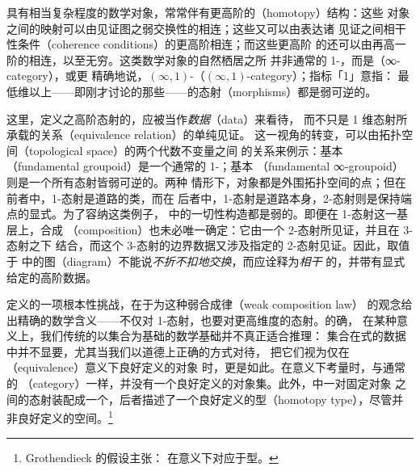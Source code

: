 具有相当复杂程度的数学对象，常常伴有更高阶的\trHomotopy{}（homotopy）结构：这些
对象之间的映射可以由见证图之弱交换性的\trHomotopy{}相连；这些\trHomotopy{}又可以由表达诸
见证之间相干性条件（coherence conditions）的更高阶\trHomotopy{}相连；而这些更高阶
的\trHomotopy{}还可以由再高一阶的\trHomotopy{}相连，以至无穷。这类数学对象的自然栖居之所
并非通常的 1-\trCategory{}，而是\textbf{\trInfinityCategory}（∞-category），或更
精确地说，$(\infty,1)$-\trCategory{}（$(\infty,1)$-category）；指标「1」意指：
最低维以上——即刚才讨论的那些\trHomotopy——的态射（morphisms）都是弱可逆的。

这里，定义\trInfinityCategory{}之高阶态射的\trHomotopy{}，应被当作\emph{数据}（data）来看待，
而不只是 1 维态射所承载的\trEquivalence{}关系（equivalence relation）的单纯见证。
这一视角的转变，可以由拓扑空间（topological space）的两个代数不变量之间
的关系来例示：基本\trGroupoid{}（fundamental groupoid）是一个通常的 1-\trCategory{}；基本%
\trInfinityGroupoid{}（fundamental ∞-groupoid）则是一个所有态射皆弱可逆的\trInfinityCategory{}。两种
情形下，对象都是外围拓扑空间的点；但在前者中，1-态射是道路的\trHomotopy{}类，而在
后者中，1-态射是道路本身，2-态射则是保持端点的显式\trHomotopy{}。为了容纳这类例子，
\trInfinityCategory{}中的一切\trCategory{}性构造都是弱的。即便在 1-态射这一基层上，合成
（composition）也未必唯一确定：它由一个 2-态射所见证，并且在 3-态射之下
结合，而这个 3-态射的边界数据又涉及指定的 2-态射见证。因此，取值于\trInfinityCategory
中的图（diagram）不能说\emph{不折不扣地交换}，而应诠释为\emph{\trHomotopy{}相干}
的，并带有显式给定的高阶数据。

定义\trInfinityCategory{}的一项根本性挑战，在于为这种弱合成律（weak composition law）
的观念给出精确的数学含义——不仅对 1-态射，也要对更高维度的态射。的确，
在某种意义上，我们传统的以集合为基础的数学基础并不真正适合推理\trInfinityCategory{}：
集合在\trInfinityCategory{}式的数据中并不显要，尤其当我们以道德上正确的方式对待\trInfinityCategory{}，
把它们视为仅在\textbf{\trEquivalence}（equivalence）意义下良好定义的对象
时，更是如此。在\trEquivalence{}意义下考量时，\trInfinityCategory{}与通常的\textbf{\trCategory}
（category）一样，并没有一个良好定义的对象集。此外，\trInfinityCategory{}中一对固定对象
之间的态射装配成一个\trInfinityGroupoid{}，后者描述了一个良好定义的\trHomotopy{}型（homotopy
type），尽管并非良好定义的空间。\footnote{Grothendieck 的\trHomotopy{}假设主张：
\trInfinityGroupoid{}在\trEquivalence{}意义下对应于\trHomotopy{}型。}

